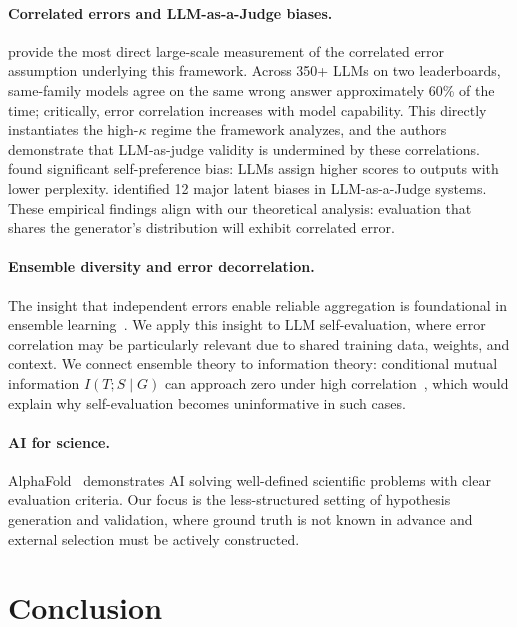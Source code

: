 \documentclass[11pt]{article}
\begin{document}
\paragraph{Correlated errors and LLM-as-a-Judge biases.}
\citet{kim2025correlated} provide the most direct large-scale measurement of the correlated
error assumption underlying this framework. Across 350+ LLMs on two leaderboards, same-family
models agree on the same wrong answer approximately 60\% of the time; critically, error
correlation increases with model capability. This directly instantiates the high-$\kappa$
regime the framework analyzes, and the authors demonstrate that LLM-as-judge validity is
undermined by these correlations. \citet{panickssery2024selfpreference} found significant
self-preference bias: LLMs assign higher scores to outputs with lower perplexity.
\citet{li2024llmjudgebias} identified 12 major latent biases in LLM-as-a-Judge systems.
These empirical findings align with our theoretical analysis: evaluation that shares the
generator's distribution will exhibit correlated error.

\paragraph{Ensemble diversity and error decorrelation.} The insight that independent errors
enable reliable aggregation is foundational in ensemble learning~\citep{krogh1995ensemble}.
We apply this insight to LLM self-evaluation, where error correlation may be particularly
relevant due to shared training data, weights, and context. We connect ensemble theory to
information theory: conditional mutual information $I(T; S \mid G)$ can approach zero under
high correlation~\citep{cover2006elements}, which would explain why self-evaluation becomes
uninformative in such cases.

\paragraph{AI for science.} AlphaFold~\citep{alphafold} demonstrates AI solving well-defined
scientific problems with clear evaluation criteria. Our focus is the less-structured setting
of hypothesis generation and validation, where ground truth is not known in advance and
external selection must be actively constructed.

\section{Conclusion}
\end{document}
